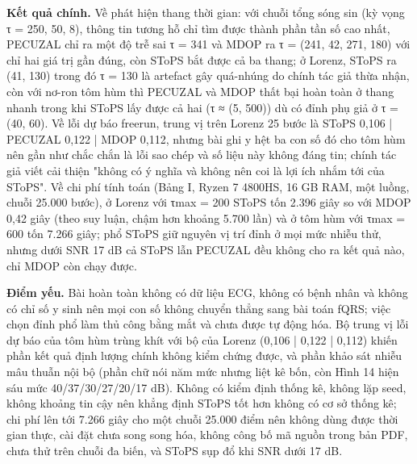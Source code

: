 \documentclass[12pt,a4paper]{article}
\begin{document}
\noindent \textbf{Kết quả chính.} Về phát hiện thang thời gian: với chuỗi tổng sóng sin (kỳ vọng τ = 250, 50, 8), thông tin tương hỗ chỉ tìm được thành phần tần số cao nhất, PECUZAL chỉ ra một độ trễ sai τ = 341 và MDOP ra τ = (241, 42, 271, 180) với chỉ hai giá trị gần đúng, còn SToPS bắt được cả ba thang; ở Lorenz, SToPS ra (41, 130) trong đó τ = 130 là artefact gây quá-nhúng do chính tác giả thừa nhận, còn với nơ-ron tôm hùm thì PECUZAL và MDOP thất bại hoàn toàn ở thang nhanh trong khi SToPS lấy được cả hai (τ ≈ (5, 500)) dù có đỉnh phụ giả ở τ = (40, 60). Về lỗi dự báo freerun, trung vị trên Lorenz 25 bước là SToPS 0,106 | PECUZAL 0,122 | MDOP 0,112, nhưng bài ghi y hệt ba con số đó cho tôm hùm nên gần như chắc chắn là lỗi sao chép và số liệu này không đáng tin; chính tác giả viết cải thiện "không có ý nghĩa và không nên coi là lợi ích nhắm tới của SToPS". Về chi phí tính toán (Bảng I, Ryzen 7 4800HS, 16 GB RAM, một luồng, chuỗi 25.000 bước), ở Lorenz với τmax = 200 SToPS tốn 2.396 giây so với MDOP 0,42 giây (theo suy luận, chậm hơn khoảng 5.700 lần) và ở tôm hùm với τmax = 600 tốn 7.266 giây; phổ SToPS giữ nguyên vị trí đỉnh ở mọi mức nhiễu thử, nhưng dưới SNR 17 dB cả SToPS lẫn PECUZAL đều không cho ra kết quả nào, chỉ MDOP còn chạy được.\par\vspace{3pt}
\noindent \textbf{Điểm yếu.} Bài hoàn toàn không có dữ liệu ECG, không có bệnh nhân và không có chỉ số y sinh nên mọi con số không chuyển thẳng sang bài toán fQRS; việc chọn đỉnh phổ làm thủ công bằng mắt và chưa được tự động hóa. Bộ trung vị lỗi dự báo của tôm hùm trùng khít với bộ của Lorenz (0,106 | 0,122 | 0,112) khiến phần kết quả định lượng chính không kiểm chứng được, và phần khảo sát nhiễu mâu thuẫn nội bộ (phần chữ nói năm mức nhưng liệt kê bốn, còn Hình 14 hiện sáu mức 40/37/30/27/20/17 dB). Không có kiểm định thống kê, không lặp seed, không khoảng tin cậy nên khẳng định SToPS tốt hơn không có cơ sở thống kê; chi phí lên tới 7.266 giây cho một chuỗi 25.000 điểm nên không dùng được thời gian thực, cài đặt chưa song song hóa, không công bố mã nguồn trong bản PDF, chưa thử trên chuỗi đa biến, và SToPS sụp đổ khi SNR dưới 17 dB.\par\vspace{3pt}
\end{document}
